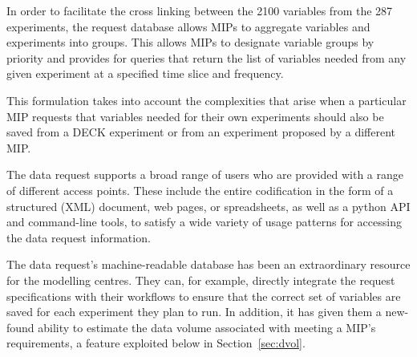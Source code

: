 \documentclass[gmd,manuscript]{copernicus}
\begin{document}
In order to facilitate the cross linking between the 2100 variables
from the 287 experiments, the request database allows MIPs to aggregate
variables and experiments into groups. This allows MIPs to designate
variable groups by priority and provides for queries that return the
list of variables needed
from any given experiment at a specified time slice and
frequency.


This formulation takes into account the complexities that arise when a
particular MIP requests that variables needed for their own
experiments should also be saved from a DECK experiment or from an
experiment proposed by a different MIP.

The data request supports a broad range of users who are 
provided with a range of different access points. These include the
entire codification in the form of a structured (XML) document, web
pages, or spreadsheets, as well as a python API and command-line tools,
to satisfy a wide variety of usage patterns for accessing 
the data request information.


The data request's machine-readable database has been an extraordinary
resource for the modelling centres. They can, for example, directly
integrate the request specifications with their workflows to ensure
that the correct set of variables are saved for each experiment they
plan to run. In addition, it has given them a new-found ability to
estimate the data volume associated with meeting a MIP's requirements,
a feature exploited below in Section~\ref{sec:dvol}.
\end{document}
